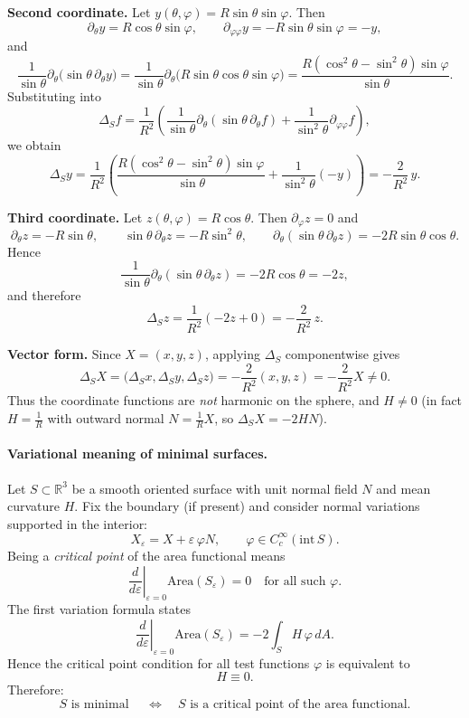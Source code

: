 \documentclass[12pt,a4paper]{article}
\theoremstyle{plain}
\theoremstyle{definition}      %
\begin{document}
\medskip
\textbf{Second coordinate.}
Let $y(\theta,\varphi)=R\sin\theta\sin\varphi$. Then
\[
\partial_\theta y=R\cos\theta\sin\varphi,\qquad
\partial_{\varphi\varphi}y=-R\sin\theta\sin\varphi=-y,
\]
and
\[
\frac{1}{\sin\theta}\partial_\theta\bigl(\sin\theta\,\partial_\theta y\bigr)
=\frac{1}{\sin\theta}\partial_\theta\bigl(R\sin\theta\cos\theta\sin\varphi\bigr)
=\frac{R(\cos^2\theta-\sin^2\theta)\sin\varphi}{\sin\theta}.
\]
Substituting into
\[
\Delta_S f=\frac{1}{R^2}\left(\frac{1}{\sin\theta}\partial_\theta(\sin\theta\,\partial_\theta f)
+\frac{1}{\sin^2\theta}\partial_{\varphi\varphi} f\right),
\]
we obtain
\[
\Delta_S y
=\frac{1}{R^2}\left(\frac{R(\cos^2\theta-\sin^2\theta)\sin\varphi}{\sin\theta}
+\frac{1}{\sin^2\theta}(-y)\right)
=-\frac{2}{R^2}\,y.
\]

\medskip
\textbf{Third coordinate.}
Let $z(\theta,\varphi)=R\cos\theta$. Then $\partial_\varphi z=0$ and
\[
\partial_\theta z=-R\sin\theta,\qquad
\sin\theta\,\partial_\theta z=-R\sin^2\theta,\qquad
\partial_\theta(\sin\theta\,\partial_\theta z)=-2R\sin\theta\cos\theta.
\]
Hence
\[
\frac{1}{\sin\theta}\partial_\theta(\sin\theta\,\partial_\theta z)=-2R\cos\theta=-2z,
\]
and therefore
\[
\Delta_S z
=\frac{1}{R^2}\left(-2z+0\right)
=-\frac{2}{R^2}\,z.
\]

\medskip
\textbf{Vector form.}
Since $X=(x,y,z)$, applying $\Delta_S$ componentwise gives
\[
\Delta_S X=\bigl(\Delta_S x,\Delta_S y,\Delta_S z\bigr)
=-\frac{2}{R^2}(x,y,z)
=-\frac{2}{R^2}X\neq 0.
\]
Thus the coordinate functions are \emph{not} harmonic on the sphere, and $H\neq 0$
(in fact $H=\frac{1}{R}$ with outward normal $N=\frac{1}{R}X$, so $\Delta_S X=-2HN$).

\paragraph{Variational meaning of minimal surfaces.}
Let $S\subset\mathbb{R}^3$ be a smooth oriented surface with unit normal field $N$ and mean curvature $H$.
Fix the boundary (if present) and consider normal variations supported in the interior:
\[
X_\varepsilon = X+\varepsilon\,\varphi N,\qquad \varphi\in C_c^\infty(\mathrm{int}\,S).
\]
Being a \emph{critical point} of the area functional means
\[
\left.\frac{d}{d\varepsilon}\right|_{\varepsilon=0}\mathrm{Area}(S_\varepsilon)=0
\quad \text{for all such }\varphi.
\]
The first variation formula states
\[
\left.\frac{d}{d\varepsilon}\right|_{\varepsilon=0}\mathrm{Area}(S_\varepsilon)
= -2\int_S H\,\varphi\,dA.
\]
Hence the critical point condition for all test functions $\varphi$ is equivalent to
\[
H\equiv 0.
\]
Therefore:
\[
S \text{ is minimal } \quad\Longleftrightarrow\quad S \text{ is a critical point of the area functional.}
\]
\end{document}
